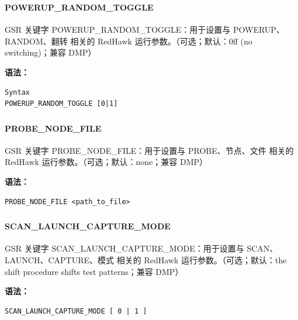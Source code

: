 \subsubsection{}
\paragraph*{POWERUP_RANDOM_TOGGLE}

GSR 关键字 POWERUP_RANDOM_TOGGLE：用于设置与 POWERUP、RANDOM、翻转 相关的 RedHawk 运行参数。（可选；默认：0ff (no switching)；兼容 DMP）

\textbf{语法：}
\begin{lstlisting}
Syntax
POWERUP_RANDOM_TOGGLE [0|1]
\end{lstlisting}

\subsubsection{}
\paragraph*{PROBE_NODE_FILE}

GSR 关键字 PROBE_NODE_FILE：用于设置与 PROBE、节点、文件 相关的 RedHawk 运行参数。（可选；默认：none；兼容 DMP）

\textbf{语法：}
\begin{lstlisting}
PROBE_NODE_FILE <path_to_file>
\end{lstlisting}

\subsubsection{}
\paragraph*{SCAN_LAUNCH_CAPTURE_MODE}

GSR 关键字 SCAN_LAUNCH_CAPTURE_MODE：用于设置与 SCAN、LAUNCH、CAPTURE、模式 相关的 RedHawk 运行参数。（可选；默认：the shift procedure shifts test patterns；兼容 DMP）

\textbf{语法：}
\begin{lstlisting}
SCAN_LAUNCH_CAPTURE_MODE [ 0 | 1 ]
\end{lstlisting}

\subsubsection{}
